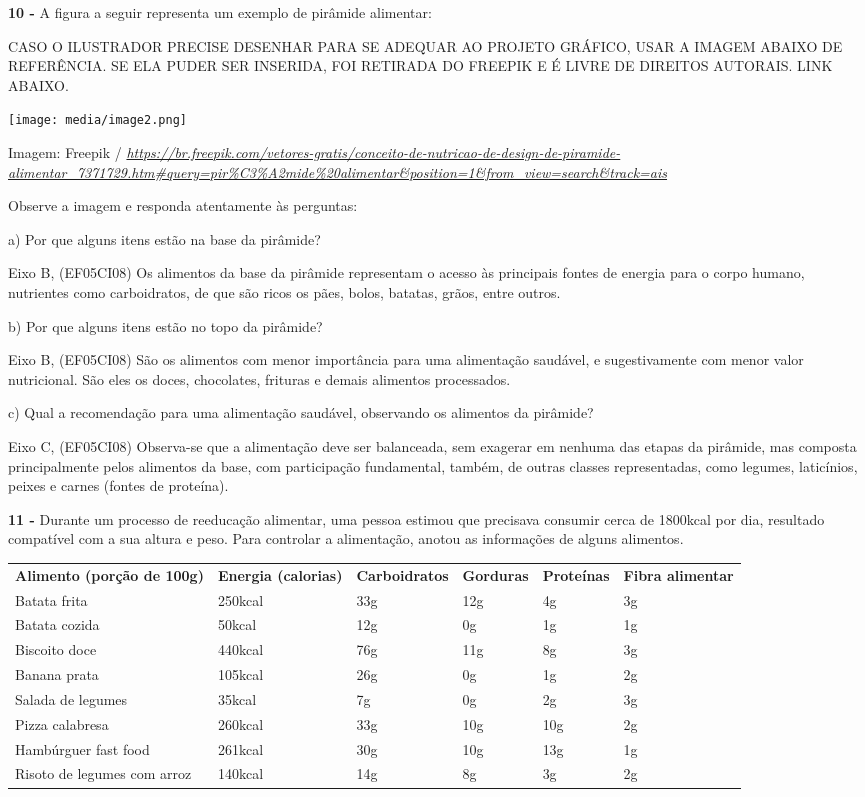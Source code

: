 \textbf{10 -} A figura a seguir representa um exemplo de pirâmide
alimentar:

CASO O ILUSTRADOR PRECISE DESENHAR PARA SE ADEQUAR AO PROJETO GRÁFICO,
USAR A IMAGEM ABAIXO DE REFERÊNCIA. SE ELA PUDER SER INSERIDA, FOI
RETIRADA DO FREEPIK E É LIVRE DE DIREITOS AUTORAIS. LINK ABAIXO.

\texttt{[image: media/image2.png]}

Imagem: Freepik /
\href{https://br.freepik.com/vetores-gratis/conceito-de-nutricao-de-design-de-piramide-alimentar_7371729.htm\#query=pir\%C3\%A2mide\%20alimentar\&position=1\&from_view=search\&track=ais}{\emph{https://br.freepik.com/vetores-gratis/conceito-de-nutricao-de-design-de-piramide-alimentar\_7371729.htm\#query=pir\%C3\%A2mide\%20alimentar\&position=1\&from\_view=search\&track=ais}}

Observe a imagem e responda atentamente às perguntas:

a) Por que alguns itens estão na base da pirâmide?

Eixo B, (EF05CI08) Os alimentos da base da pirâmide representam o acesso
às principais fontes de energia para o corpo humano, nutrientes como
carboidratos, de que são ricos os pães, bolos, batatas, grãos, entre
outros.

b) Por que alguns itens estão no topo da pirâmide?

Eixo B, (EF05CI08) São os alimentos com menor importância para uma
alimentação saudável, e sugestivamente com menor valor nutricional. São
eles os doces, chocolates, frituras e demais alimentos processados.

c) Qual a recomendação para uma alimentação saudável, observando os
alimentos da pirâmide?

Eixo C, (EF05CI08) Observa-se que a alimentação deve ser balanceada, sem
exagerar em nenhuma das etapas da pirâmide, mas composta principalmente
pelos alimentos da base, com participação fundamental, também, de outras
classes representadas, como legumes, laticínios, peixes e carnes (fontes
de proteína).

\textbf{11 -} Durante um processo de reeducação alimentar, uma pessoa
estimou que precisava consumir cerca de 1800kcal por dia, resultado
compatível com a sua altura e peso. Para controlar a alimentação, anotou
as informações de alguns alimentos.

\begin{longtable}[]{@{}llllll@{}}
\toprule
\textbf{Alimento (porção de 100g)} & \textbf{Energia (calorias)} &
\textbf{Carboidratos} & \textbf{Gorduras} & \textbf{Proteínas} &
\textbf{Fibra alimentar}\tabularnewline
Batata frita & 250kcal & 33g & 12g & 4g & 3g\tabularnewline
Batata cozida & 50kcal & 12g & 0g & 1g & 1g\tabularnewline
Biscoito doce & 440kcal & 76g & 11g & 8g & 3g\tabularnewline
Banana prata & 105kcal & 26g & 0g & 1g & 2g\tabularnewline
Salada de legumes & 35kcal & 7g & 0g & 2g & 3g\tabularnewline
Pizza calabresa & 260kcal & 33g & 10g & 10g & 2g\tabularnewline
Hambúrguer fast food & 261kcal & 30g & 10g & 13g & 1g\tabularnewline
Risoto de legumes com arroz & 140kcal & 14g & 8g & 3g &
2g\tabularnewline
\bottomrule
\end{longtable}

